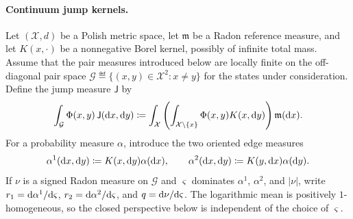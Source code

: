 \paragraph{Continuum jump kernels.}
Let $(\mathcal X,d)$ be a Polish metric space, let $\mathfrak m$ be a Radon reference measure, and let $K(x,\cdot)$ be a nonnegative Borel kernel, possibly of infinite total mass. Assume that the pair measures introduced below are locally finite on the off-diagonal pair space $\mathcal G\eqdef\{(x,y)\in\mathcal X^2:x\neq y\}$ for the states under consideration. Define the jump measure $\mathsf J$ by
\begin{equation}\label{eq-nonlocal-jump-measure}
\int_{\mathcal G}\Phi(x,y)\,\mathsf J(\mathrm{d} x,\mathrm{d} y)
\coloneqq
\int_{\mathcal X}\left(\int_{\mathcal X\setminus\{x\}}\Phi(x,y)K(x,\mathrm{d} y)\right)\mathfrak m(\mathrm{d} x).
\end{equation}
For a probability measure $\alpha$, introduce the two oriented edge measures
\begin{equation}\label{eq-nonlocal-oriented-edge-measures}
\alpha^1(\mathrm{d} x,\mathrm{d} y)\coloneqq K(x,\mathrm{d} y)\alpha(\mathrm{d} x),
\qquad
\alpha^2(\mathrm{d} x,\mathrm{d} y)\coloneqq K(y,\mathrm{d} x)\alpha(\mathrm{d} y).
\end{equation}
If $\nu$ is a signed Radon measure on $\mathcal G$ and $\varsigma$ dominates $\alpha^1$, $\alpha^2$, and $|\nu|$, write $r_1=\mathrm{d}\alpha^1/\mathrm{d}\varsigma$, $r_2=\mathrm{d}\alpha^2/\mathrm{d}\varsigma$, and $q=\mathrm{d}\nu/\mathrm{d}\varsigma$. The logarithmic mean is positively $1$-homogeneous, so the closed perspective below is independent of the choice of $\varsigma$.

